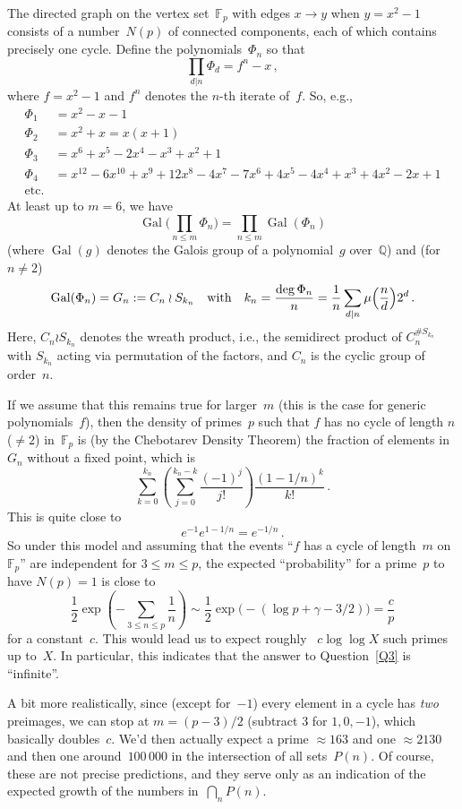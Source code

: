 \documentclass[12pt,a4paper]{amsart}
\newcommand{\Q}{{\mathbb Q}}
\newcommand{\F}{{\mathbb F}}
\newcommand{\Gal}{\operatorname{Gal}}
\theoremstyle{definition}
\numberwithin{equation}{section}
\begin{document}
The directed graph on the vertex set~$\F_p$ with edges $x \to y$ when $y = x^2 - 1$
consists of a number~$N(p)$ of connected components, each of which contains
precisely one cycle. Define the polynomials~$\Phi_n$ so that
\[ \prod_{d|n} \Phi_d = f^n - x \,, \]
where $f = x^2 - 1$ and $f^n$ denotes the $n$-th iterate of~$f$. So, e.g.,
\begin{align*}
  \Phi_1 &= x^2 - x - 1 \\
  \Phi_2 &= x^2 + x = x   (x + 1) \\
  \Phi_3 &= x^6 + x^5 - 2 x^4 - x^3 + x^2 + 1 \\
  \Phi_4 &= x^{12} - 6 x^{10} + x^9 + 12 x^8 - 4 x^7 - 7 x^6 + 4 x^5 - 4 x^4 + x^3 + 4 x^2 - 2 x + 1 \\
  \text{etc.}
\end{align*}
At least up to $m = 6$, we have
\[ \Gal\bigl(\prod_{n \leqslant m} \Phi_n\bigr) = \prod_{n \leqslant m} \Gal(\Phi_n) \]
(where $\Gal(g)$ denotes the Galois group of a polynomial~$g$ over~$\Q$)
and (for $n \neq 2$)
\[ \Gal(\Phi_n) = G_n := C_n \wr S_{k_n} \quad \text{with} \quad
      k_n = \frac{\deg \Phi_n}{n} = \frac{1}{n} \sum_{d \mid n} \mu\Bigl(\frac{n}{d}\Bigr) 2^d \,.
\]
Here, $C_n \wr S_{k_n}$ denotes the wreath product, i.e., the semidirect product of $C_n^{\#S_{k_n}}$
with $S_{k_n}$ acting via permutation of the factors, and $C_n$ is the cyclic group of order~$n$.

If we assume that this remains true for larger~$m$ (this is the case for generic polynomials~$f$),
then the density of primes~$p$
such that $f$ has no cycle of length $n$ ($\neq 2$) in~$\F_p$ is (by the Chebotarev Density Theorem)
the fraction of elements in~$G_n$ without a fixed point, which is
\[ \sum_{k=0}^{k_n} \left(\sum_{j=0}^{k_n-k} \frac{(-1)^j}{j!}\right) \frac{(1 - 1/n)^k}{k!} \,. \]
This is quite close to
\[ e^{-1} e^{1 - 1/n} = e^{-1/n} \,. \]
So under this model and assuming that the events ``$f$ has a cycle of length~$m$ on~$\F_p$''
are independent for $3 \leqslant m \leqslant p$,
the expected ``probability'' for a prime~$p$ to have $N(p) = 1$ is close to
\[ \frac{1}{2} \exp\left(-\sum_{3 \leqslant n \leqslant p} \frac{1}{n}\right)
    \sim \frac{1}{2} \exp\bigl(-(\log p + \gamma - 3/2)\bigr)
    = \frac{c}{p}
\]
for a constant~$c$. This would lead us to expect roughly ~$c \log \log X$  such primes
up to~$X$. In particular, this indicates that the answer to Question~\ref{Q3} is
``infinite''.

A bit more realistically, since (except for~$-1$) every element in a cycle
has \emph{two} preimages, we can stop at $m = (p-3)/2$  (subtract $3$ for $1, 0, -1$),
which basically doubles~$c$.
We'd then actually expect a prime $\approx 163$ and one $\approx 2130$ and then one
around~$100\,000$ in the intersection of all sets~$P(n)$. Of course, these are not
precise predictions, and they serve only as an indication of the expected growth
of the numbers in~$\bigcap_n P(n)$.
\end{document}
